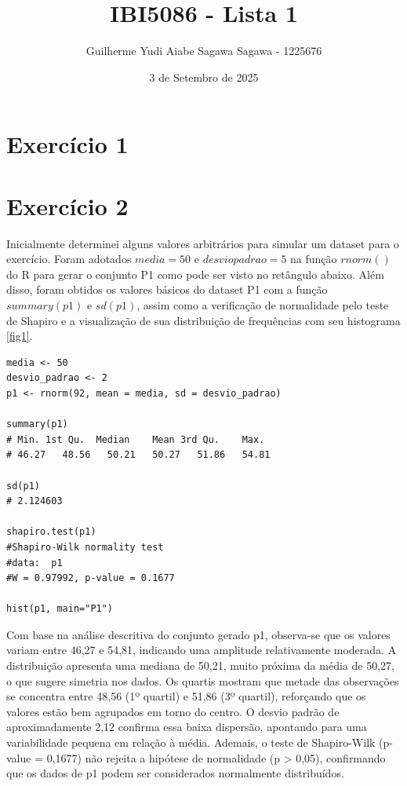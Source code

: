 \documentclass{article}
\title{IBI5086 - Lista 1}
\author{Guilherme Yudi Aiabe Sagawa Sagawa - 1225676}
\date{3 de Setembro de 2025}
\begin{document}
\maketitle
\section{Exercício 1}



\section{Exercício 2}

Inicialmente determinei alguns valores arbitrários para simular um dataset para o exercício. Foram adotados $media = 50$ e $desvio padrao = 5$ na função $rnorm()$ do R para gerar o conjunto P1 como pode ser visto no retângulo abaixo. Além disso, foram obtidos os valores básicos do dataset P1 com a função $summary(p1)$ e $sd(p1)$, assim como a verificação de normalidade pelo teste de Shapiro e a visualização de sua distribuição de frequências com seu histograma \ref{fig1}.

\begin{lstlisting}
media <- 50
desvio_padrao <- 2
p1 <- rnorm(92, mean = media, sd = desvio_padrao)

summary(p1)
# Min. 1st Qu.  Median    Mean 3rd Qu.    Max. 
# 46.27   48.56   50.21   50.27   51.86   54.81 

sd(p1)
# 2.124603

shapiro.test(p1)
#Shapiro-Wilk normality test
#data:  p1
#W = 0.97992, p-value = 0.1677

hist(p1, main="P1")
\end{lstlisting}

Com base na análise descritiva do conjunto gerado p1, observa-se que os valores variam entre 46,27 e 54,81, indicando uma amplitude relativamente moderada. A distribuição apresenta uma mediana de 50,21, muito próxima da média de 50,27, o que sugere simetria nos dados. Os quartis mostram que metade das observações se concentra entre 48,56 (1º quartil) e 51,86 (3º quartil), reforçando que os valores estão bem agrupados em torno do centro. O desvio padrão de aproximadamente 2,12 confirma essa baixa dispersão, apontando para uma variabilidade pequena em relação à média. Ademais, o teste de Shapiro-Wilk (p-value = 0,1677) não rejeita a hipótese de normalidade (p > 0,05), confirmando que os dados de p1 podem ser considerados normalmente distribuídos.
\end{document}

